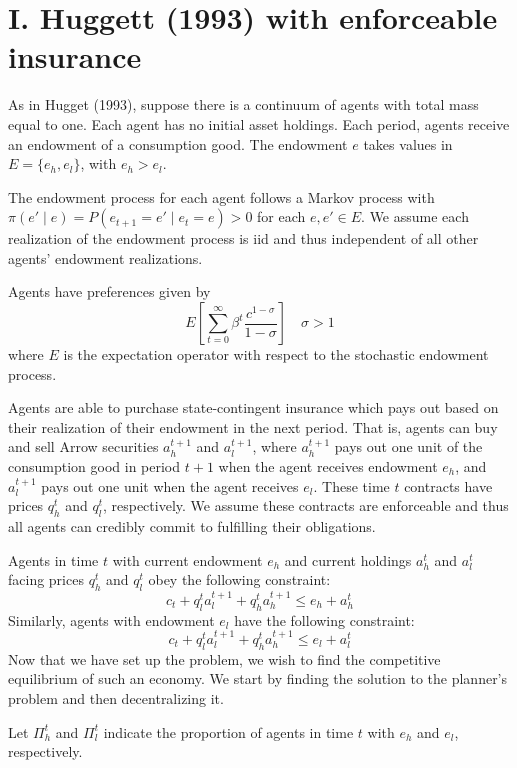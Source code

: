 \documentclass[12pt]{article}
\begin{document}
\section{I. Huggett (1993) with enforceable insurance}
As in Hugget (1993), suppose there is a continuum of agents with total mass equal to one. Each agent has no initial asset holdings. Each period, agents receive an endowment of a consumption good. The endowment $e$ takes values in $E = \{e_h, e_l\}$, with $e_h > e_l$. 

The endowment process for each agent follows a Markov process with $\pi(e' \mid e) = P(e_{t+1} = e' \mid e_{t} = e) > 0$ for each $e, e' \in E$. We assume each realization of the endowment process is iid and thus independent of all other agents' endowment realizations.

Agents have preferences given by 
\[E\left[ \sum_{t=0}^{\infty} \beta^t \frac{c^{1-\sigma}}{1-\sigma}\right] \quad \sigma > 1\]
where $E$ is the expectation operator with respect to the stochastic endowment process.

Agents are able to purchase state-contingent insurance which pays out based on their realization of their endowment in the next period. That is, agents can buy and sell Arrow securities $a_h^{t+1}$ and $a_l^{t+1}$, where $a_h^{t+1}$ pays out one unit of the consumption good in period $t+1$ when the agent receives endowment $e_h$, and $a_l^{t+1}$ pays out one unit when the agent receives $e_l$. These time $t$ contracts have prices $q_h^{t}$ and $q_l^{t}$, respectively. We assume these contracts are enforceable and thus all agents can credibly commit to fulfilling their obligations.

Agents in time $t$ with current endowment $e_h$ and current holdings $a_h^t$ and $a_l^t$ facing prices $q_h^t$ and $q_l^t$ obey the following constraint:
\[c_t + q_l^t a_l^{t+1} + q_h^t a_h^{t+1} \leq e_h + a_h^t\]
Similarly, agents with endowment $e_l$ have the following constraint:
\[c_t + q_l^t a_l^{t+1} + q_h^t a_h^{t+1} \leq e_l + a_l^t\]
Now that we have set up the problem, we wish to find the competitive equilibrium of such an economy. We start by finding the solution to the planner's problem and then decentralizing it.

Let $\Pi_h^t$ and $\Pi_l^{t}$ indicate the proportion of agents in time $t$ with $e_h$ and $e_l$, respectively. %
\end{document}
